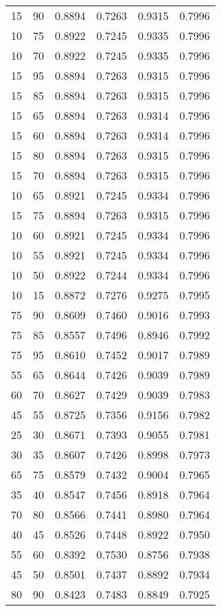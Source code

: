 \begin{center}
\begin{longtable}{|l|l|l|l|l|l|}
15 & 90 & 0.8894 & 0.7263 & 0.9315 & 0.7996 \\
10 & 75 & 0.8922 & 0.7245 & 0.9335 & 0.7996 \\
10 & 70 & 0.8922 & 0.7245 & 0.9335 & 0.7996 \\
15 & 95 & 0.8894 & 0.7263 & 0.9315 & 0.7996 \\
15 & 85 & 0.8894 & 0.7263 & 0.9315 & 0.7996 \\
15 & 65 & 0.8894 & 0.7263 & 0.9314 & 0.7996 \\
15 & 60 & 0.8894 & 0.7263 & 0.9314 & 0.7996 \\
15 & 80 & 0.8894 & 0.7263 & 0.9315 & 0.7996 \\
15 & 70 & 0.8894 & 0.7263 & 0.9315 & 0.7996 \\
10 & 65 & 0.8921 & 0.7245 & 0.9334 & 0.7996 \\
15 & 75 & 0.8894 & 0.7263 & 0.9315 & 0.7996 \\
10 & 60 & 0.8921 & 0.7245 & 0.9334 & 0.7996 \\
10 & 55 & 0.8921 & 0.7245 & 0.9334 & 0.7996 \\
10 & 50 & 0.8922 & 0.7244 & 0.9334 & 0.7996 \\
10 & 15 & 0.8872 & 0.7276 & 0.9275 & 0.7995 \\
75 & 90 & 0.8609 & 0.7460 & 0.9016 & 0.7993 \\
75 & 85 & 0.8557 & 0.7496 & 0.8946 & 0.7992 \\
75 & 95 & 0.8610 & 0.7452 & 0.9017 & 0.7989 \\
55 & 65 & 0.8644 & 0.7426 & 0.9039 & 0.7989 \\
60 & 70 & 0.8627 & 0.7429 & 0.9039 & 0.7983 \\
45 & 55 & 0.8725 & 0.7356 & 0.9156 & 0.7982 \\
25 & 30 & 0.8671 & 0.7393 & 0.9055 & 0.7981 \\
30 & 35 & 0.8607 & 0.7426 & 0.8998 & 0.7973 \\
65 & 75 & 0.8579 & 0.7432 & 0.9004 & 0.7965 \\
35 & 40 & 0.8547 & 0.7456 & 0.8918 & 0.7964 \\
70 & 80 & 0.8566 & 0.7441 & 0.8980 & 0.7964 \\
40 & 45 & 0.8526 & 0.7448 & 0.8922 & 0.7950 \\
55 & 60 & 0.8392 & 0.7530 & 0.8756 & 0.7938 \\
45 & 50 & 0.8501 & 0.7437 & 0.8892 & 0.7934 \\
80 & 90 & 0.8423 & 0.7483 & 0.8849 & 0.7925 \\

\end{longtable}
\end{center}
